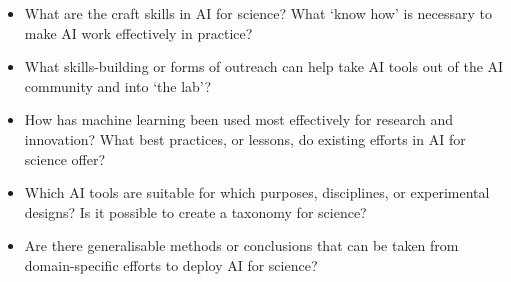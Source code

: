 \begin{itemize}
\item
  What are the craft skills in AI for science? What `know how' is
  necessary to make AI work effectively in practice?
\item
  What skills-building or forms of outreach can help take AI tools out
  of the AI community and into `the lab'?
\item
  How has machine learning been used most effectively for research and
  innovation? What best practices, or lessons, do existing efforts in AI
  for science offer?
\item
  Which AI tools are suitable for which purposes, disciplines, or
  experimental designs? Is it possible to create a taxonomy for science?
\item
  Are there generalisable methods or conclusions that can be taken from
  domain-specific efforts to deploy AI for science?
\end{itemize}
